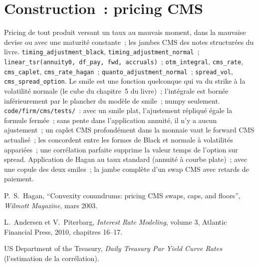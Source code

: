 \section{Construction~: pricing CMS}\label{bld:rc:convexity-adjustments-and-constant-maturity-products:cms}

\begin{build}
 Pricing de tout produit versant un taux au mauvais moment, dans la
mauvaise devise ou avec une maturité constante~; les jambes CMS des
notes structurées du livre.
 \texttt{timing\_adjustment\_black},
\texttt{timing\_adjustment\_normal}~; \texttt{linear\_tsr(annuity0, df\_pay, fwd,
accruals)}~; \texttt{otm\_integral}, \texttt{cms\_rate}, \texttt{cms\_caplet},
\texttt{cms\_rate\_hagan}~; \texttt{quanto\_adjustment\_normal}~;
\texttt{spread\_vol}, \texttt{cms\_spread\_option}.
 Le smile est une fonction quelconque qui va du strike à la volatilité normale (le
cube du chapitre~5 du livre)~; l'intégrale est bornée inférieurement par le plancher du modèle de smile~;
numpy seulement.
 \texttt{code/firm/cms/tests/}~: avec un smile plat, l'ajustement
répliqué égale la formule fermée~; sans pente dans l'application annuité, il
n'y a aucun ajustement~; un caplet CMS profondément dans la monnaie vaut le
forward CMS actualisé~; les  concordent entre les formes de Black et normale
à volatilités appariées~; une corrélation parfaite supprime la valeur temps de l'option sur
spread.
 Application de Hagan au taux standard (annuité à courbe plate)~; 
avec une copule des deux smiles~; la jambe complète d'un swap CMS avec retards de paiement.
\end{build}

\begin{omsources}
\item P.\ S.\ Hagan, ``Convexity conundrums: pricing CMS swaps, caps, and
floors'', \emph{Wilmott Magazine}, mars 2003.
\item L.\ Andersen et V.\ Piterbarg, \emph{Interest Rate Modeling}, volume 3,
Atlantic Financial Press, 2010, chapitres 16--17.
\item US Department of the Treasury, \emph{Daily Treasury Par Yield Curve Rates}
(l'estimation de la corrélation).
\end{omsources}

